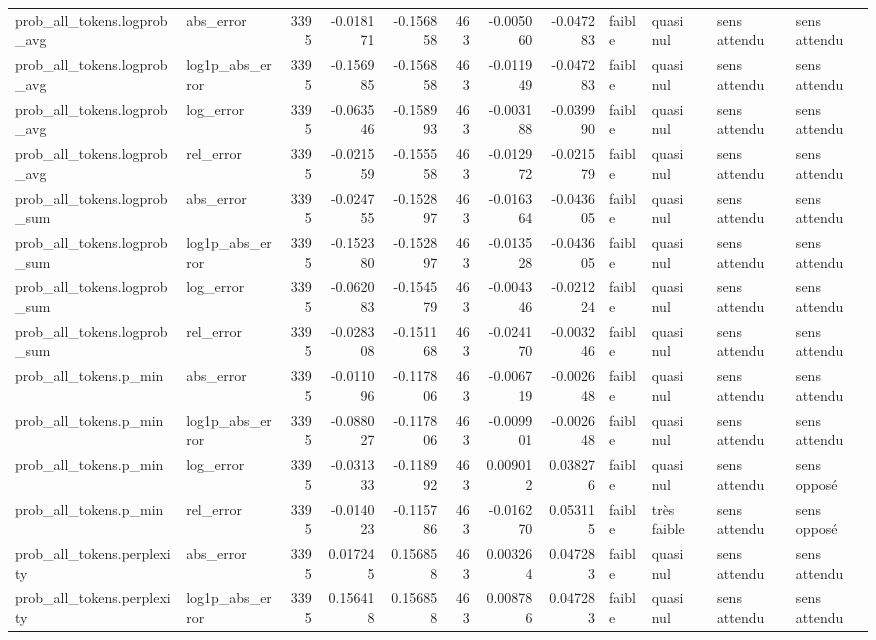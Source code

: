 \begin{longtable}{llrrrrrrllll}
prob\_all\_tokens.logprob\_avg & abs\_error & 3395 & -0.018171 & -0.156858 & 463 & -0.005060 & -0.047283 & faible & quasi nul & sens attendu & sens attendu \\
prob\_all\_tokens.logprob\_avg & log1p\_abs\_error & 3395 & -0.156985 & -0.156858 & 463 & -0.011949 & -0.047283 & faible & quasi nul & sens attendu & sens attendu \\
prob\_all\_tokens.logprob\_avg & log\_error & 3395 & -0.063546 & -0.158993 & 463 & -0.003188 & -0.039990 & faible & quasi nul & sens attendu & sens attendu \\
prob\_all\_tokens.logprob\_avg & rel\_error & 3395 & -0.021559 & -0.155558 & 463 & -0.012972 & -0.021579 & faible & quasi nul & sens attendu & sens attendu \\
prob\_all\_tokens.logprob\_sum & abs\_error & 3395 & -0.024755 & -0.152897 & 463 & -0.016364 & -0.043605 & faible & quasi nul & sens attendu & sens attendu \\
prob\_all\_tokens.logprob\_sum & log1p\_abs\_error & 3395 & -0.152380 & -0.152897 & 463 & -0.013528 & -0.043605 & faible & quasi nul & sens attendu & sens attendu \\
prob\_all\_tokens.logprob\_sum & log\_error & 3395 & -0.062083 & -0.154579 & 463 & -0.004346 & -0.021224 & faible & quasi nul & sens attendu & sens attendu \\
prob\_all\_tokens.logprob\_sum & rel\_error & 3395 & -0.028308 & -0.151168 & 463 & -0.024170 & -0.003246 & faible & quasi nul & sens attendu & sens attendu \\
prob\_all\_tokens.p\_min & abs\_error & 3395 & -0.011096 & -0.117806 & 463 & -0.006719 & -0.002648 & faible & quasi nul & sens attendu & sens attendu \\
prob\_all\_tokens.p\_min & log1p\_abs\_error & 3395 & -0.088027 & -0.117806 & 463 & -0.009901 & -0.002648 & faible & quasi nul & sens attendu & sens attendu \\
prob\_all\_tokens.p\_min & log\_error & 3395 & -0.031333 & -0.118992 & 463 & 0.009012 & 0.038276 & faible & quasi nul & sens attendu & sens opposé \\
prob\_all\_tokens.p\_min & rel\_error & 3395 & -0.014023 & -0.115786 & 463 & -0.016270 & 0.053115 & faible & très faible & sens attendu & sens opposé \\
prob\_all\_tokens.perplexity & abs\_error & 3395 & 0.017245 & 0.156858 & 463 & 0.003264 & 0.047283 & faible & quasi nul & sens attendu & sens attendu \\
prob\_all\_tokens.perplexity & log1p\_abs\_error & 3395 & 0.156418 & 0.156858 & 463 & 0.008786 & 0.047283 & faible & quasi nul & sens attendu & sens attendu \\

\end{longtable}
